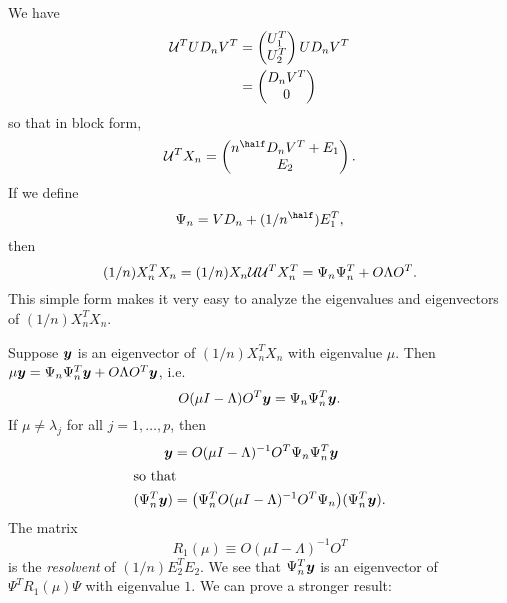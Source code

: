 We have
\begin{align*}
    \mathcal{U}^T U D_n V^T
        &= \left(
           \begin{matrix}
               U_1^T \\ 
               U_2^T
           \end{matrix}
           \right) 
           U D_n V^T \\
        &= \left(
           \begin{matrix}
               D_n V^T \\
               0
           \end{matrix}
           \right)
\end{align*}
so that in block form,
\[
    \U^T X_n
    =
    \left(
    \begin{matrix}
            n^\half D_n V^T + E_1  \\
            E_2
    \end{matrix}
    \right).
\]
If we define 
\begin{equation} \label{E:psi}
    \Psi_n = V D_n + (1 / n^\half) E_1^T,
\end{equation}
then 
\begin{equation}\label{E:arrow}
    (1/n) X_n^T X_n = (1/n) X_n \mathcal{U} \mathcal{U}^T X_n^T = \Psi_n \Psi_n^T + O \Lambda O^T.
\end{equation}
This simple form makes it very easy to analyze the eigenvalues and eigenvectors of $(1/n) X_n^T X_n$.

Suppose $\boldsymbol{y}$ is an eigenvector of $(1/n) X_n^T X_n$ with eigenvalue $\mu$.  Then $\mu \boldsymbol{y} = \Psi_n \Psi_n^T \boldsymbol{y} + O \Lambda O^T \boldsymbol{y}$, i.e.
\[
    O (\mu I - \Lambda) O^T \boldsymbol{y} = \Psi_n \Psi_n^T \boldsymbol{y}.
\]
If $\mu \neq \lambda_j$ for all $j = 1, \ldots, p$, then
\begin{align*}
    \boldsymbol{y} &= O (\mu I - \Lambda)^{-1} O^T \Psi_n \Psi_n^T \boldsymbol{y} \\
    \intertext{so that}
    (\Psi_n^T \boldsymbol{y}) &= \big(\Psi_n^T O (\mu I - \Lambda)^{-1} O^T \Psi_n \big) (\Psi_n^T \boldsymbol{y}).
\end{align*}
The matrix 
\begin{equation}
    R_1(\mu)
    \equiv
    O (\mu I - \Lambda)^{-1} O^T
\end{equation}
is the \emph{resolvent} of $(1/n) E_2^T E_2$.  We see that
$\Psi_n^T \boldsymbol{y}$ is an eigenvector of $\Psi^T R_1 (\mu) \Psi$
with eigenvalue $1$.  We can prove a stronger result:


